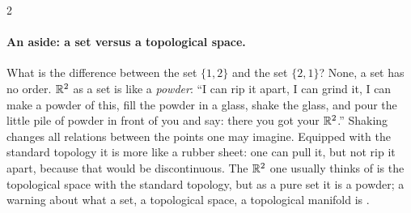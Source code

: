 \begin{paracol}{2}
\paragraph{An aside: a set versus a topological space.} What is the difference between the set $\{1,2\}$ and the set $\{2,1\}$? None, a set has no order. $\mathbb{R}^2$ as a set is like a \emph{powder}: ``I can rip it apart, I can grind it, I can make a powder of this, fill
the powder in a glass, shake the glass, and pour the little pile of powder in front of you and say: there you got your $\mathbb{R}^2$.'' Shaking changes all relations between the points one may imagine. Equipped with the standard topology it is more like a rubber sheet: one can pull it, but not
rip it apart, because that would be discontinuous. The $\mathbb{R}^2$ one usually thinks of is the topological space with the standard topology, but as a pure set it is a powder; a warning about what a set, a topological space, a topological manifold is
.


\end{paracol}
